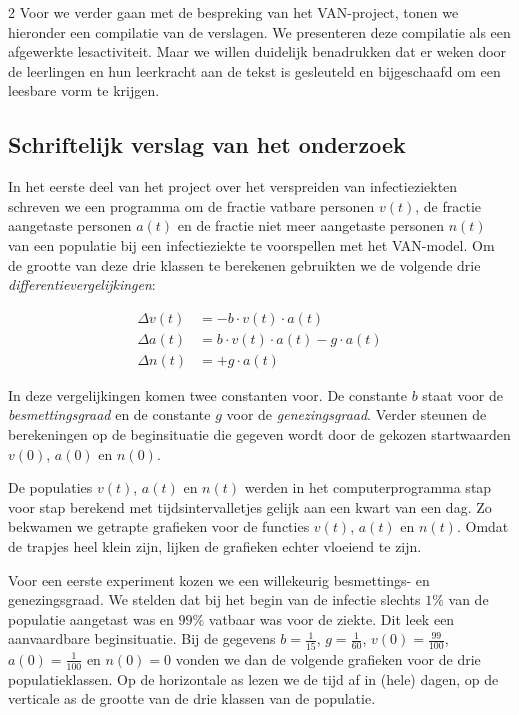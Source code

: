 \begin{multicols}{2}
Voor we verder gaan met de bespreking van het VAN-project, tonen we hieronder een compilatie van de verslagen. We presenteren deze compilatie als een afgewerkte lesactiviteit. Maar we willen duidelijk benadrukken dat er weken door de leerlingen en hun leerkracht aan de tekst is gesleuteld en bijgeschaafd om een leesbare vorm te krijgen. 

\end{multicols}

\subsection{Schriftelijk verslag van het onderzoek}



In het eerste deel van het project over het verspreiden van infectieziekten schreven we een programma om de fractie vatbare personen $v(t)$, de fractie aangetaste personen $a(t)$ en de fractie niet meer aangetaste personen $n(t)$ van een populatie bij een infectieziekte te voorspellen
met het VAN-model. Om de grootte van deze drie klassen te berekenen gebruikten we de volgende drie \emph{differentievergelijkingen}:

\begin{align}
\Delta v(t)&=-b \cdot v(t) \cdot a(t) \\
\Delta a(t)&=b \cdot v(t) \cdot a(t)-g \cdot a(t) \\
\Delta n(t)&=+g \cdot a(t)
\end{align}

In deze vergelijkingen komen twee constanten voor. De constante $b$ staat voor de \emph{besmettingsgraad} en de constante $g$ voor de \emph{genezingsgraad}. Verder steunen de berekeningen op de beginsituatie die gegeven wordt door de gekozen startwaarden $v(0)$, $a(0)$ en $n(0)$.

De populaties $v(t)$, $a(t)$ en $n(t)$ werden in het computerprogramma stap voor stap berekend met tijdsintervalletjes gelijk aan een kwart van een dag. Zo bekwamen we getrapte grafieken voor de functies $v(t)$, $a(t)$ en $n(t)$. Omdat de trapjes heel klein zijn, lijken de grafieken echter vloeiend te zijn. 

Voor een eerste experiment kozen we een willekeurig besmettings- en genezingsgraad. We stelden dat bij het begin van de infectie slechts $1\%$ van de populatie aangetast was en $99\%$ vatbaar was voor de ziekte. Dit leek een aanvaardbare beginsituatie. Bij de gegevens $b=\frac{1}{15}$, $g=\frac{1}{60}$, $v(0)=\frac{99}{100}$, $a(0)=\frac{1}{100}$ en $n(0)=0$ vonden we dan de volgende grafieken voor de drie populatieklassen. Op de horizontale as lezen we de tijd af in (hele) dagen, op de verticale as de grootte van de drie klassen van de populatie.

